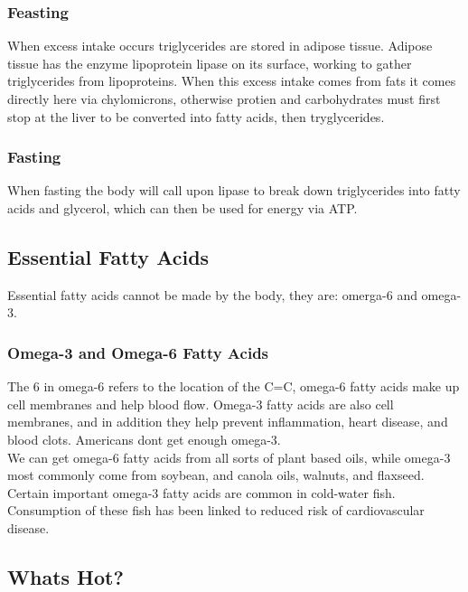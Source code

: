 \documentclass[letterpaper, 11pt]{article}
\begin{document}
\subsubsection{Feasting}
\label{sec:org737dbc5}
When excess intake occurs triglycerides are stored in adipose tissue. Adipose tissue has the enzyme lipoprotein lipase on its surface, working to gather triglycerides from lipoproteins. When this excess intake comes from fats it comes directly here via chylomicrons, otherwise protien and carbohydrates must first stop at the liver to be converted into fatty acids, then tryglycerides.\\
\subsubsection{Fasting}
\label{sec:orgb4b0eb0}
When fasting the body will call upon lipase to break down triglycerides into fatty acids and glycerol, which can then be used for energy via ATP.\\
\subsection{Essential Fatty Acids}
\label{sec:orgb39e579}
Essential fatty acids cannot be made by the body, they are: omerga-6 and omega-3.\\
\subsubsection{Omega-3 and Omega-6 Fatty Acids}
\label{sec:org1a87a49}
The 6 in omega-6 refers to the location of the C=C, omega-6 fatty acids make up cell membranes and help blood flow. Omega-3 fatty acids are also cell membranes, and in addition they help prevent inflammation, heart disease, and blood clots. Americans dont get enough omega-3.\\
We can get omega-6 fatty acids from all sorts of plant based oils, while omega-3 most commonly come from soybean, and canola oils, walnuts, and flaxseed. Certain important omega-3 fatty acids are common in cold-water fish. Consumption of these fish has been linked to reduced risk of cardiovascular disease.\\
\subsection{Whats Hot?}
\label{sec:org2b9334a}
\end{document}
